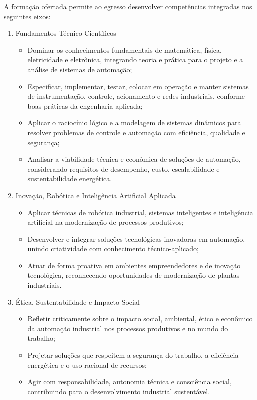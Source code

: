 A formação ofertada permite ao egresso desenvolver competências integradas nos seguintes eixos:

\begin{enumerate}
\item Fundamentos Técnico-Científicos

\begin{itemize}
    \item Dominar os conhecimentos fundamentais de matemática, física, eletricidade e eletrônica, integrando teoria e prática para o projeto e a análise de sistemas de automação;
    \item Especificar, implementar, testar, colocar em operação e manter sistemas de instrumentação, controle, acionamento e redes industriais, conforme boas práticas da engenharia aplicada;
    \item Aplicar o raciocínio lógico e a modelagem de sistemas dinâmicos para resolver problemas de controle e automação com eficiência, qualidade e segurança;
    \item Analisar a viabilidade técnica e econômica de soluções de automação, considerando requisitos de desempenho, custo, escalabilidade e sustentabilidade energética.
\end{itemize}

\item Inovação, Robótica e Inteligência Artificial Aplicada

\begin{itemize}
    \item Aplicar técnicas de robótica industrial, sistemas inteligentes e inteligência artificial na modernização de processos produtivos;
    \item Desenvolver e integrar soluções tecnológicas inovadoras em automação, unindo criatividade com conhecimento técnico-aplicado;
    \item Atuar de forma proativa em ambientes empreendedores e de inovação tecnológica, reconhecendo oportunidades de modernização de plantas industriais.
\end{itemize}

\item Ética, Sustentabilidade e Impacto Social

\begin{itemize}
    \item Refletir criticamente sobre o impacto social, ambiental, ético e econômico da automação industrial nos processos produtivos e no mundo do trabalho;
    \item Projetar soluções que respeitem a segurança do trabalho, a eficiência energética e o uso racional de recursos;
    \item Agir com responsabilidade, autonomia técnica e consciência social, contribuindo para o desenvolvimento industrial sustentável.
\end{itemize}


\end{enumerate}
